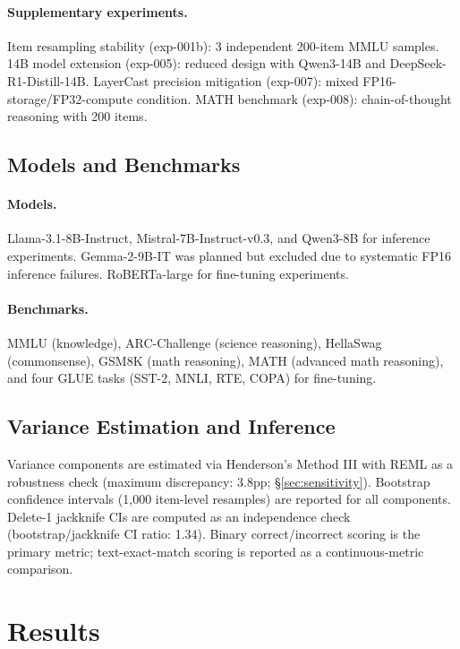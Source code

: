 \documentclass[11pt,twocolumn]{article}
\begin{document}
\paragraph{Supplementary experiments.}
Item resampling stability (exp-001b): 3 independent 200-item MMLU samples. 14B model extension (exp-005): reduced design with Qwen3-14B and DeepSeek-R1-Distill-14B. LayerCast precision mitigation (exp-007): mixed FP16-storage/FP32-compute condition. MATH benchmark (exp-008): chain-of-thought reasoning with 200 items.

\subsection{Models and Benchmarks}

\paragraph{Models.}
Llama-3.1-8B-Instruct, Mistral-7B-Instruct-v0.3, and Qwen3-8B for inference experiments. Gemma-2-9B-IT was planned but excluded due to systematic FP16 inference failures. RoBERTa-large for fine-tuning experiments.

\paragraph{Benchmarks.}
MMLU (knowledge), ARC-Challenge (science reasoning), HellaSwag (commonsense), GSM8K (math reasoning), MATH (advanced math reasoning), and four GLUE tasks (SST-2, MNLI, RTE, COPA) for fine-tuning.

\subsection{Variance Estimation and Inference}

Variance components are estimated via Henderson's Method III with REML as a robustness check (maximum discrepancy: 3.8pp; \S\ref{sec:sensitivity}). Bootstrap confidence intervals (1{,}000 item-level resamples) are reported for all components. Delete-1 jackknife CIs are computed as an independence check (bootstrap/jackknife CI ratio: 1.34). Binary correct/incorrect scoring is the primary metric; text-exact-match scoring is reported as a continuous-metric comparison.

\section{Results}
\end{document}
